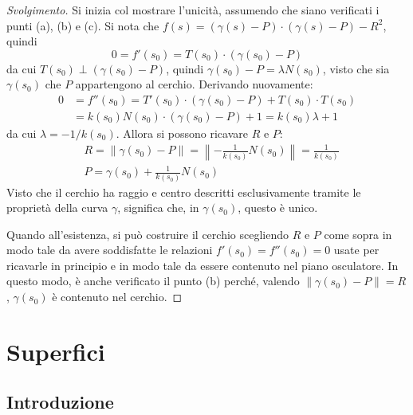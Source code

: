 \documentclass[12pt]{article}
\theoremstyle{style}
\newenvironment{svolgimento}{\renewcommand\qedsymbol{$\blacksquare$}\begin{proof}[Svolgimento]}{\end{proof}}
\numberwithin{equation}{subsection}
\begin{document}
\begin{svolgimento}
	Si inizia col mostrare l'unicit\`a, assumendo che siano verificati i punti (a), (b) e (c).
	Si nota che $f(s) = (\gamma(s) - P) \cdot (\gamma(s) - P) - R^2$, quindi
	\[
	0=f'(s_0) = T(s_0) \cdot (\gamma(s_0) - P) 
	\] 
	da cui $T(s_0) \perp (\gamma(s_0) - P)$, quindi $\gamma(s_0) - P = \lambda N(s_0)$, visto che sia $\gamma(s_0)$ che $P$ appartengono al cerchio.
	Derivando nuovamente:
	\[
		\begin{split}
			0&=f''(s_0) = T'(s_0) \cdot (\gamma(s_0) - P) + T(s_0) \cdot T(s_0) \\
			 &= k(s_0) N(s_0) \cdot (\gamma(s_0) - P) +1=k(s_0) \lambda +1
		\end{split}
	\] 
	da cui $\lambda =-1/k(s_0)$.
	Allora si possono ricavare $R$ e $P$:
	\[
		\begin{split}
			&R = \left\lVert \gamma(s_0) - P \right\rVert = \left\lVert - \frac{1}{k(s_0)}N(s_0) \right\rVert  = \frac{1}{k(s_0)}\\
			&P = \gamma(s_0) + \frac{1}{k(s_0)}N(s_0)
		\end{split}
	\] 
	Visto che il cerchio ha raggio e centro descritti esclusivamente tramite le propriet\`a della curva $\gamma$, significa che, in $\gamma(s_0)$, questo \`e unico.

	Quando all'esistenza, si pu\`o costruire il cerchio scegliendo $R$ e $P$ come sopra in modo tale da avere soddisfatte le relazioni $f'(s_0) = f''(s_0) =0$ usate per ricavarle in principio e in modo tale da essere contenuto nel piano osculatore.
	In questo modo, \`e anche verificato il punto (b) perch\'e, valendo $\left\lVert \gamma(s_0) - P \right\rVert = R$, $\gamma(s_0)$ \`e contenuto nel cerchio.
\end{svolgimento}

\newpage
\section{Superfici}
\subsection{Introduzione}
\end{document}
